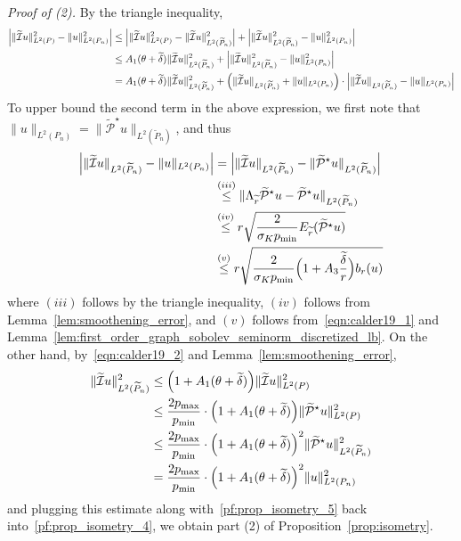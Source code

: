 \documentclass{article}
\newcommand{\1}{\mathbf{1}}
\newcommand{\Leb}{L}
\newcommand{\mc}[1]{\mathcal{#1}}
\newcommand{\wt}[1]{\widetilde{#1}}
\theoremstyle{alden}
\theoremstyle{aldenthm}
\theoremstyle{definition}
\theoremstyle{remark}
\begin{document}
\textit{Proof of (2).}
By the triangle inequality,
\begin{align}
\Bigl|\|\wt{\mc{I}}u\|_{\Leb^2(P)}^2 - \|u\|_{\Leb^2(P_n)}^2\Bigr| & \leq \Bigl|\|\wt{\mc{I}}u\|_{\Leb^2(P)}^2 - \|\wt{\mc{I}}u\|_{\Leb^2(\wt{P}_n)}^2\Bigr| + \Bigl|\|\wt{\mc{I}}u\|_{\Leb^2(\wt{P}_n)}^2 - \|u\|_{\Leb^2(P_n)}^2\Bigr| \nonumber \\
& \leq A_1(\theta + \wt{\delta}) \|\wt{\mc{I}}u\|_{\Leb^2(\wt{P}_n)}^2 + \Bigl|\|\wt{\mc{I}}u\|_{\Leb^2(\wt{P}_n)}^2 - \|u\|_{\Leb^2(P_n)}^2\Bigr| \nonumber\\
& = A_1(\theta + \wt{\delta}) \|\wt{\mc{I}}u\|_{\Leb^2(\wt{P}_n)}^2 + \Bigl(\|\wt{\mc{I}}u\|_{\Leb^2(\wt{P}_n)} + \|u\|_{\Leb^2(P_n)}\Bigr) \cdot \Bigl|\|\wt{\mc{I}}u\|_{\Leb^2(\wt{P}_n)} - \|u\|_{\Leb^2(P_n)}\Bigr| \label{pf:prop_isometry_4}
\end{align}
To upper bound the second term in the above expression, we first note that~$\|u\|_{\Leb^2(P_n)} = \|\wt{\mc{P}}^{\star}u\|_{\Leb^2(\wt{P}_n)}$, and thus
\begin{align}
\Bigl|\|\wt{\mc{I}}u\|_{\Leb^2(\wt{P}_n)} - \|u\|_{\Leb^2(P_n)} \Bigr| & = \Bigl|\|\wt{\mc{I}}u\|_{\Leb^2(\wt{P}_n)} - \|\wt{\mc{P}}^{\star}u\|_{\Leb^2(\wt{P}_n)}\Bigr| \nonumber \\
& \overset{(iii)}{\leq} \|\Lambda_{\wt{r}}\wt{\mc{P}}^{\star}u - \wt{\mc{P}}^{\star}u\|_{\Leb^2(\wt{P}_n)} \nonumber \\
& \overset{(iv)}{\leq} r \sqrt{\frac{2}{\sigma_K p_{\min}} E_{\wt{r}}(\wt{\mc{P}}^{\star}u)} \nonumber \\
& \overset{(v)}{\leq} r \sqrt{\frac{2}{\sigma_K p_{\min}} \Bigl(1 + A_3\frac{\wt{\delta}}{r}\Bigr) b_r(u)} \label{pf:prop_isometry_5}
\end{align}
where $(iii)$ follows by the triangle inequality, $(iv)$ follows from Lemma~\ref{lem:smoothening_error}, and $(v)$ follows from~\eqref{eqn:calder19_1} and Lemma~\ref{lem:first_order_graph_sobolev_seminorm_discretized_lb}. On the other hand, by~\eqref{eqn:calder19_2} and Lemma~\ref{lem:smoothening_error},
\begin{align*}
\|\wt{\mc{I}}u\|_{\Leb^2(\wt{P}_n)}^2 & \leq \Bigl(1 + A_1(\theta + \wt{\delta})\Bigr) \|\wt{\mc{I}}u\|_{\Leb^2(P)}^2 \\
& \leq \frac{2p_{\max}}{p_{\min}} \cdot \Bigl(1 + A_1(\theta + \wt{\delta})\Bigr) \|\wt{\mc{P}}^{\star}u\|_{\Leb^2(P)}^2 \\
& \leq \frac{2p_{\max}}{p_{\min}} \cdot \Bigl(1 + A_1(\theta + \wt{\delta})\Bigr)^2 \|\wt{\mc{P}}^{\star}u\|_{\Leb^2(\wt{P}_n)}^2 \\
& = \frac{2p_{\max}}{p_{\min}} \cdot \Bigl(1 + A_1(\theta + \wt{\delta})\Bigr)^2 \|u\|_{\Leb^2(P_n)}^2
\end{align*}
and plugging this estimate along with~\eqref{pf:prop_isometry_5} back into~\eqref{pf:prop_isometry_4}, we obtain part (2) of Proposition~\ref{prop:isometry}.
\end{document}
